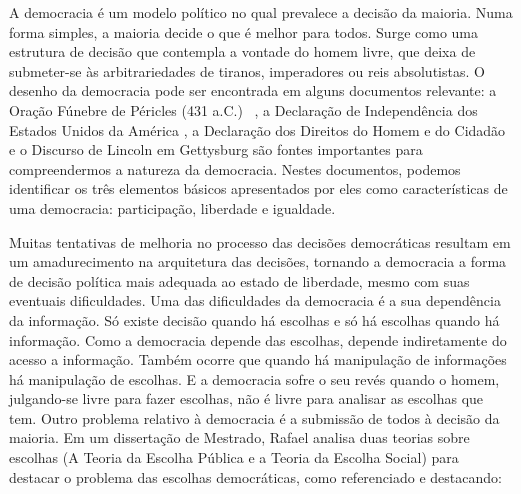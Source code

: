 


A democracia é um modelo político no qual prevalece a decisão da maioria. Numa forma simples, a maioria decide o que é melhor para todos. Surge como uma estrutura de decisão que contempla a vontade do homem livre, que deixa de submeter-se às arbitrariedades de tiranos, imperadores ou reis absolutistas. O desenho da democracia pode ser encontrada em alguns documentos relevante: a Oração Fúnebre de Péricles (431 a.C.)~ \cite{oracaoPericles}, a Declaração de Independência dos Estados Unidos da América \cite{euadeclara}, a Declaração dos Direitos do Homem e do Cidadão \cite{dcidadao} e o Discurso de Lincoln em Gettysburg \cite{dlincoln} são fontes importantes para compreendermos a natureza da democracia. Nestes documentos, podemos identificar  os três elementos básicos apresentados por eles como características de uma democracia: participação, liberdade e igualdade.

Muitas tentativas de melhoria no processo das decisões democráticas resultam em um amadurecimento na arquitetura das decisões, tornando a democracia a forma de decisão política mais adequada ao estado de liberdade, mesmo com suas eventuais dificuldades. Uma das dificuldades da democracia é a sua dependência da informação. Só existe decisão quando há escolhas e só há escolhas quando há informação. Como a democracia depende das escolhas, depende indiretamente do acesso a informação. Também ocorre que quando há manipulação de informações há manipulação de escolhas. E a democracia sofre o seu revés quando o homem, julgando-se livre para fazer escolhas, não é livre para analisar as escolhas que tem. 
Outro problema relativo à democracia é a submissão de todos à decisão da maioria. Em um dissertação de Mestrado, Rafael  analisa duas teorias sobre escolhas (A Teoria da Escolha Pública e a Teoria da Escolha Social) para destacar o problema das escolhas democráticas, como referenciado e destacando:

